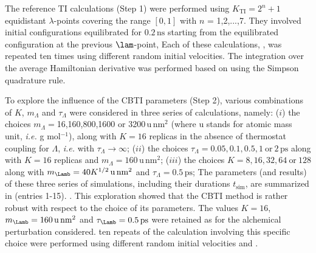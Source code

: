 The reference TI calculations (Step 1) were performed using $K_{\mathrm{TI}}=2^n+1$ 
equidistant $\lambda$-points covering the range $[0,1]$  with $n$ = 1,2,...,7.
They involved initial configurations equilibrated for $0.2\,\mathrm{ns}$ 
starting from the equilibrated configuration at the previous $\lam$-point,
%
Each of these calculations, ,
was repeated ten times using different random initial velocities. 
%
The integration over the average Hamiltonian derivative 
was 
performed based on  using the Simpson quadrature rule\cite{JO10.2,BR11.5,BR11.6}.


To explore the influence of the CBTI parameters (Step 2), various 
combinations of $K$, $m_\Lambda$ and $\tau_\Lambda$ were considered in 
three series of calculations, namely:
%
($i$) the choices $m_{\Lambda}=$16,160,800,1600 or 3200$\,\mathrm{u}\,\mathrm{nm}^2$
       (where $\mathrm{u}$ stands for atomic mass unit, {\em i.e.} g mol$^{-1}$),
      along with $K=16$ replicas in the absence of thermostat coupling 
      for $\Lambda$, {\em i.e.} with $\tau_\Lambda\rightarrow\infty$;
%
($ii$) the choices $\tau_\Lambda={0.05,0.1,0.5,1~\text{or}~2}\,\mathrm{ps}$
       along with $K=16$ replicas and $m_{\Lambda}=160\,\mathrm{u}\,\mathrm{nm}^2$;
%
($iii$) the choices $K=8,16,32,64~\text{or}~128$
       along with 
       $m_{\Lamb}=40 K^{1/2}\,\mathrm{u}\,\mathrm{nm}^2$ 
       and $\tau_{\Lambda}=0.5\,\mathrm{ps}$;
%
%
The parameters (and results) of these three series of simulations, including their durations $t_{\mathrm{sim}}$, are summarized  in  (entries 1-15).
%
.
%
%
%
This exploration showed that the CBTI method is rather robust with respect to the choice of its parameters.
The values $K=16$, $m_\Lamb=160\,\mathrm{u}\,\mathrm{nm}^2$ and $\tau_{\Lamb}=0.5\,\mathrm{ps}$ 
were retained as 
for the alchemical perturbation considered.
ten repeats of the calculation 
involving this specific choice were performed using different random initial velocities
and 
.
%
%

